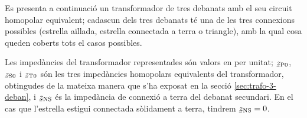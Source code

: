 Es presenta a continuació un transformador de tres debanats amb el seu circuit homopolar equivalent; cadascun dels tres debanats té una de les tres connexions possibles (estrella aïllada, estrella connectada a terra o triangle), amb la qual cosa queden coberts tots el casos possibles.

Les impedàncies del transformador representades són valors en per unitat; $\cmplx{z}\ped{P0}$, $\cmplx{z}\ped{S0}$ i $\cmplx{z}\ped{T0}$ són les tres impedàncies homopolars equivalents del transformador, obtingudes de la mateixa manera que s'ha exposat en la secció \ref{sec:trafo-3-deban}, i $\cmplx{z}\ped{NS}$ és  la impedància de connexió a terra del debanat secundari. En el cas que l'estrella estigui connectada sòlidament a terra, tindrem $\cmplx{z}\ped{NS}=0$.

\begin{center}
    
\end{center}

